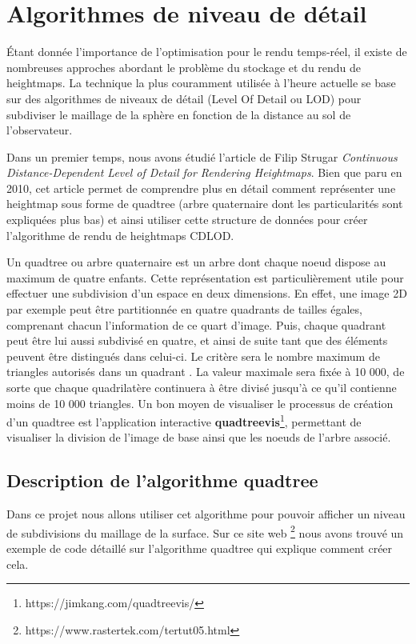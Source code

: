 \documentclass[12pt]{report}
\begin{document}
\newpage

\section{Algorithmes de niveau de détail}

Étant donnée l'importance de l'optimisation pour le rendu temps-réel, il existe de nombreuses approches abordant le problème du stockage et du rendu de heightmaps. La technique la plus couramment utilisée à l'heure actuelle se base sur des algorithmes de niveaux de détail (Level Of Detail ou LOD) pour subdiviser le maillage de la sphère en fonction de la distance au sol de l'observateur.

Dans un premier temps, nous avons étudié l'article de Filip Strugar \textit{Continuous Distance-Dependent Level of Detail for Rendering Heightmaps}\textbf{\cite{FStrugar}}. Bien que paru en 2010, cet article permet de comprendre plus en détail comment représenter une heightmap sous forme de quadtree (arbre quaternaire dont les particularités sont expliquées plus bas) et ainsi utiliser cette structure de données pour créer l'algorithme de rendu de heightmaps CDLOD.

Un quadtree ou arbre quaternaire est un arbre dont chaque noeud dispose au maximum de quatre enfants. Cette représentation est particulièrement utile pour effectuer une subdivision d'un espace en deux dimensions. En effet, une image 2D par exemple peut être partitionnée en quatre quadrants de tailles égales, comprenant chacun l'information de ce quart d'image. Puis, chaque quadrant peut être lui aussi subdivisé en quatre, et ainsi de suite tant que des éléments peuvent être distingués dans celui-ci. Le critère sera le nombre maximum de triangles autorisés dans un quadrant . La valeur maximale sera fixée à 10 000, de sorte que chaque quadrilatère continuera à être divisé jusqu'à ce qu'il contienne moins de 10 000 triangles. Un bon moyen de visualiser le processus de création d'un quadtree est l'application interactive \textbf{quadtreevis}\footnote{https://jimkang.com/quadtreevis/}, permettant de visualiser la division de l'image de base ainsi que les noeuds de l'arbre associé.

\subsection{Description de l'algorithme quadtree}
Dans ce projet nous allons utiliser cet algorithme pour pouvoir afficher un niveau de subdivisions du maillage de la surface. Sur ce site web \footnote{https://www.rastertek.com/tertut05.html} nous avons trouvé un exemple de code détaillé sur l'algorithme quadtree qui explique comment créer cela.
\end{document}
